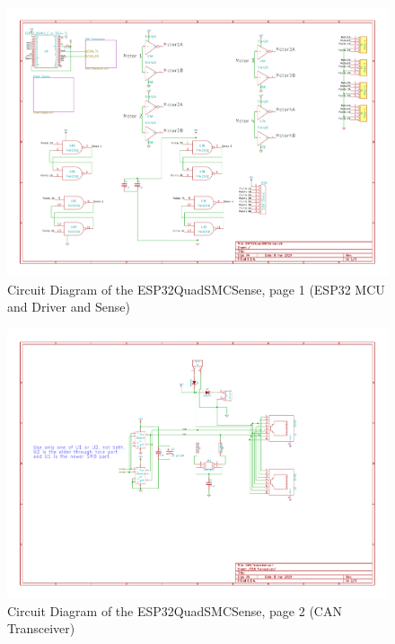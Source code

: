 \begin{figure}[hbpt]\begin{centering}%
\includegraphics[width=5in]{ESP32QuadSMCSense-1.pdf}
\caption{Circuit Diagram of the ESP32QuadSMCSense, page 1 (ESP32 MCU and Driver and Sense)}
\end{centering}\end{figure}
\begin{figure}[hbpt]\begin{centering}%
\includegraphics[width=5in]{ESP32QuadSMCSense-2.pdf}
\caption{Circuit Diagram of the ESP32QuadSMCSense, page 2 (CAN Transceiver)}
\end{centering}\end{figure}
